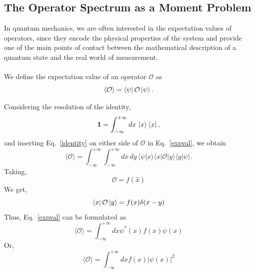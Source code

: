 \documentclass{article}
\theoremstyle{definition}
\begin{document}
\subsection{The Operator Spectrum as a Moment Problem}\label{momentprob}
In quantum mechanics, we are often interested in the expectation values of operators, since they encode the physical properties of the system and provide one of the main points of contact between the mathematical description of a quantum state and the real world of measurement.\\
\\
We define the expectation value of an operator $\mathcal{O}$ as
\begin{equation}\label{expval}
    \langle \mathcal{O} \rangle
    =
    \bra{\psi}\mathcal{O}\ket{\psi}.
\end{equation}

Considering the resolution of the identity,
\begin{equation}\label{identity}
    \mathbf{1} =\int_{-\infty}^{+\infty} dx\,\ket{x}\bra{x},
\end{equation}
and inserting Eq.~\eqref{identity} on either side of $\mathcal{O}$ in Eq.~\eqref{expval}, we obtain
\begin{equation}
    \langle \mathcal{O} \rangle
    =
    \int_{-\infty}^{+\infty}\int_{-\infty}^{+\infty} dx\,dy\,
    \langle \psi | x \rangle
    \langle x | \mathcal{O} | y \rangle
    \langle y | \psi \rangle.
\end{equation}
Taking, 
\begin{equation*}
    \mathcal{O} = f(\hat{x})
\end{equation*}
We get,
\begin{equation*}
    \bra{x}\mathcal{O}\ket{y} = f(x)\delta(x-y)
\end{equation*}
Thus, Eq.~\eqref{expval} can be formulated as 
\begin{equation}
    \langle \mathcal{O} \rangle
    =\int_{-\infty}^{+\infty} dx \psi^{*}(x)f(x)\psi(x)
\end{equation}
Or,
\begin{equation}\label{expvalIntg}
    \langle \mathcal{O} \rangle
    =\int_{-\infty}^{+\infty} dx f(x)|\psi(x)|^{2}
\end{equation}
\end{document}
